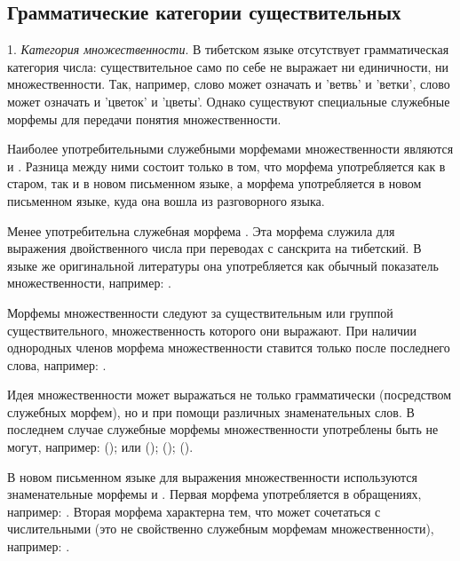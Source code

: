\subsection{Грамматические категории существительных}

1. \emph{Категория множественности}. В тибетском языке отсутствует грамматическая категория числа: существительное само по себе не выражает ни единичности, ни множественности. Так, например,
слово  может означать и 'ветвь' и 'ветки',
слово  может означать и 'цветок' и 'цветы'. Однако существуют специальные служебные морфемы для передачи понятия множественности.

Наиболее употребительными служебными морфемами множественности являются  и . Разница между ними состоит только в том, что морфема  употребляется как в старом, так и в новом письменном языке, а морфема  употребляется в новом письменном языке, куда она вошла из разговорного языка.

Менее употребительна служебная морфема .
Эта морфема служила для выражения двойственного числа при переводах с санскрита на тибетский. В языке же оригинальной литературы она употребляется как обычный показатель множественности, например: .

Морфемы множественности следуют за существительным или группой существительного, множественность которого они выражают. При наличии однородных членов морфема множественности ставится только после последнего слова, например: .

Идея множественности может выражаться не только грамматически (посредством служебных морфем), но и при помощи различных знаменательных слов. В последнем случае служебные морфемы множественности употреблены быть не могут, например:
 ();
 или  ();
 ();
 ().

В новом письменном языке для выражения множественности используются знаменательные морфемы  и .
Первая морфема употребляется в обращениях, например: . Вторая морфема характерна тем, что может сочетаться с числительными (это не свойственно служебным морфемам множественности), например:
.

